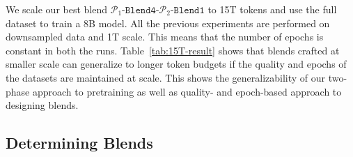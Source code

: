\documentclass[11pt]{article}
\newcommand{\mostofa}[1]{{\color{blue}\bf [MP: #1]}\xspace}
\newcommand{\phaseone}{$\mathcal{P}_1$\xspace}
\newcommand{\phasetwo}{$\mathcal{P}_2$\xspace}
\newcommand{\ponebfourptwobone}{\phaseone-$\mathtt{Blend4}$-\phasetwo-$\mathtt{Blend1}$\xspace}
\begin{document}
We scale our best blend \ponebfourptwobone to 15T tokens and use the full dataset to train a 8B model.
All the previous experiments are performed on downsampled data and 1T scale. 
This means that the number of epochs is constant in both the runs.
Table~\ref{tab:15T-result} 
shows that blends crafted at smaller scale can generalize to longer token budgets if the quality and epochs of the datasets are maintained at scale.
This shows the generalizability of our two-phase approach to pretraining as well as quality- and epoch-based approach to designing blends.





\begin{table}[t]%
\begin{center}
\end{center}
\caption[]{Results of our two-phase training approach with \ponebfourptwobone for downsampled data at 1T and then complete data at 15T.
\label{tab:15T-result}}
\end{table}

\subsection{Determining Blends}
\label{sec:finalizing-blends}

\end{document}
